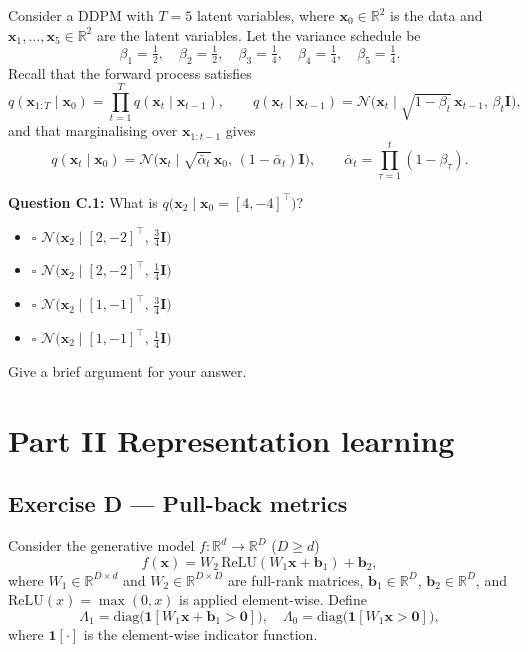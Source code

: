 \documentclass[12pt,a4paper]{article}
\newcommand{\N}{\mathcal{N}}
\begin{document}
Consider a DDPM with $T=5$ latent variables, where $\mathbf{x}_0\in\mathbb{R}^2$ is the data and
$\mathbf{x}_1,\ldots,\mathbf{x}_5\in\mathbb{R}^2$ are the latent variables.  Let the variance
schedule be
\[
  \beta_1 = \tfrac{1}{2},\quad \beta_2=\tfrac{1}{2},\quad
  \beta_3=\tfrac{1}{4},\quad \beta_4=\tfrac{1}{4},\quad \beta_5=\tfrac{1}{4}.
\]
Recall that the forward process satisfies
\[
  q(\mathbf{x}_{1:T}\mid\mathbf{x}_0)=\prod_{t=1}^T q(\mathbf{x}_t\mid\mathbf{x}_{t-1}),
  \qquad
  q(\mathbf{x}_t\mid\mathbf{x}_{t-1}) = \N\!\bigl(\mathbf{x}_t\mid\sqrt{1-\beta_t}\,\mathbf{x}_{t-1},\,\beta_t\mathbf{I}\bigr), \tag{6}
\]
and that marginalising over $\mathbf{x}_{1:t-1}$ gives
\[
  q(\mathbf{x}_t\mid\mathbf{x}_0) = \N\!\bigl(\mathbf{x}_t\mid\sqrt{\bar\alpha_t}\,\mathbf{x}_0,\,(1-\bar\alpha_t)\mathbf{I}\bigr),
  \qquad \bar\alpha_t = \prod_{\tau=1}^t (1-\beta_\tau). \tag{7}
\]

\textbf{Question C.1:} What is $q\!\bigl(\mathbf{x}_2\mid\mathbf{x}_0=[4,-4]^\top\bigr)$?

\begin{itemize}[noitemsep,label={}]
  \item[\textbf{A}] $\square$ \quad $\N\!\bigl(\mathbf{x}_2\mid [2,-2]^\top,\,\tfrac{3}{4}\mathbf{I}\bigr)$
  \item[\textbf{B}] $\square$ \quad $\N\!\bigl(\mathbf{x}_2\mid [2,-2]^\top,\,\tfrac{1}{4}\mathbf{I}\bigr)$
  \item[\textbf{C}] $\square$ \quad $\N\!\bigl(\mathbf{x}_2\mid [1,-1]^\top,\,\tfrac{3}{4}\mathbf{I}\bigr)$
  \item[\textbf{D}] $\square$ \quad $\N\!\bigl(\mathbf{x}_2\mid [1,-1]^\top,\,\tfrac{1}{4}\mathbf{I}\bigr)$
\end{itemize}

Give a brief argument for your answer.

\vspace{6cm}

\newpage
\section*{Part II \quad Representation learning}

\subsection*{Exercise D --- Pull-back metrics}

Consider the generative model $f:\mathbb{R}^d\to\mathbb{R}^D$ ($D\geq d$)
\[
  f(\mathbf{x}) = W_2\,\mathrm{ReLU}(W_1\mathbf{x}+\mathbf{b}_1)+\mathbf{b}_2, \tag{8}
\]
where $W_1\in\mathbb{R}^{D\times d}$ and $W_2\in\mathbb{R}^{D\times D}$ are full-rank matrices,
$\mathbf{b}_1\in\mathbb{R}^D$, $\mathbf{b}_2\in\mathbb{R}^D$, and
$\mathrm{ReLU}(x)=\max(0,x)$ is applied element-wise.  Define
\[
  \Lambda_1 = \mathrm{diag}\!\bigl(\mathbf{1}[W_1\mathbf{x}+\mathbf{b}_1 > \mathbf{0}]\bigr),\quad
  \Lambda_0 = \mathrm{diag}\!\bigl(\mathbf{1}[W_1\mathbf{x} > \mathbf{0}]\bigr), \tag{9}
\]
where $\mathbf{1}[\cdot]$ is the element-wise indicator function.
\end{document}

